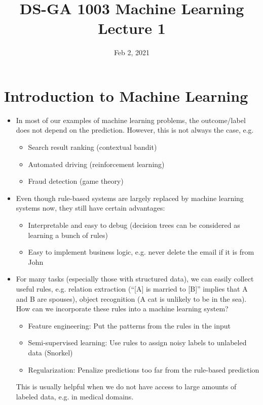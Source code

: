 \documentclass[11pt]{article}
\begin{document}
\title{DS-GA 1003 Machine Learning \\ Lecture 1}
\date{Feb 2, 2021}
\maketitle
\section{Introduction to Machine Learning}
\begin{itemize}
\item In most of our examples of machine learning problems, the outcome/label does not depend on the prediction. However, this is not always the case, e.g.
\begin{itemize}
\item Search result ranking (contextual bandit)
\item Automated driving (reinforcement learning)
\item Fraud detection (game theory)
\end{itemize}

\item Even though rule-based systems are largely replaced by machine learning systems now, they still have certain advantages:
\begin{itemize}
\item Interpretable and easy to debug (decision trees can be considered as learning a bunch of rules)
\item Easy to implement business logic, e.g. never delete the email if it is from John
\end{itemize}

\item For many tasks (especially those with structured data), we can easily collect useful rules, e.g.
relation extraction (``[A] is married to [B]'' implies that A and B are spouses),
object recognition (A cat is unlikely to be in the sea).
How can we incorporate these rules into a machine learning system?
\begin{itemize}
    \item Feature engineering: Put the patterns from the rules in the input
    \item Semi-supervised learning: Use rules to assign noisy labels to unlabeled data (Snorkel)
    \item Regularization: Penalize predictions too far from the rule-based prediction
\end{itemize}
This is usually helpful when we do not have access to large amounts of labeled data, e.g. in medical domains.
\end{itemize}
\end{document}
